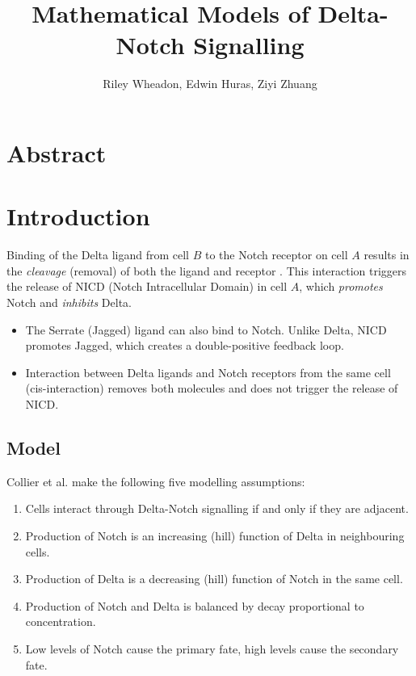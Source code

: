 \documentclass{article}
\title{Mathematical Models of Delta-Notch Signalling}
\author{Riley Wheadon, Edwin Huras, Ziyi Zhuang}
\begin{document}
\maketitle

\begin{flushleft}

\section{Abstract}

\section{Introduction}

\medskip

Binding of the Delta ligand from cell $B$ to the Notch receptor on cell $A$ results in the \emph{cleavage} (removal) of both the ligand and receptor \cite{collier_pattern_1996}. This interaction triggers the release of NICD (Notch Intracellular Domain) in cell $A$, which \emph{promotes} Notch and \emph{inhibits} Delta.

\begin{itemize}
  \item The Serrate (Jagged) ligand can also bind to Notch. Unlike Delta, NICD promotes Jagged, which creates a double-positive feedback loop.
  \item Interaction between Delta ligands and Notch receptors from the same cell (cis-interaction) removes both molecules and does not trigger the release of NICD.
\end{itemize}

\subsection{Model}

Collier et al. make the following five modelling assumptions:
\begin{enumerate}
  \item Cells interact through Delta-Notch signalling if and only if they are adjacent.
  \item Production of Notch is an increasing (hill) function of Delta in neighbouring cells.
  \item Production of Delta is a decreasing (hill) function of Notch in the same cell.
  \item Production of Notch and Delta is balanced by decay proportional to concentration.
  \item Low levels of Notch cause the primary fate, high levels cause the secondary fate.
\end{enumerate}


\end{flushleft}
\end{document}
